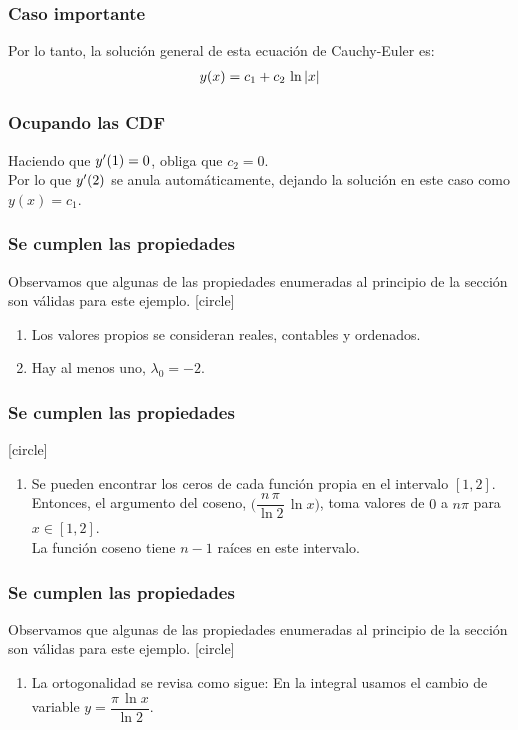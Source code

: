 \documentclass[12pt]{beamer}
\begin{document}
\begin{frame}
\frametitle{Caso importante}
Por lo tanto, la solución general de esta ecuación de Cauchy-Euler es:
\pause
\begin{align*}
y (x) = c_{1} + c_{2} \, \ln \abs{x}
\end{align*}
\end{frame}
\begin{frame}
\frametitle{Ocupando las CDF}
Haciendo que ${y}^{\prime} (1) = 0$, obliga que $c_{2} = 0$.
\\
\bigskip
\pause
Por lo que ${y}^{\prime} (2)$ se anula automáticamente, dejando la solución en este caso como $y(x) = c_{1}$.
\end{frame}
\begin{frame}
\frametitle{Se cumplen las propiedades}
Observamos que algunas de las propiedades enumeradas al principio de la sección son válidas para este ejemplo.
\pause
{}
[circle]
\begin{enumerate}[<+->]
\item Los valores propios se consideran reales, contables y ordenados.
\item Hay al menos uno, $\lambda_{0} = -2$.
\seti
\end{enumerate}
\end{frame}
\begin{frame}
\frametitle{Se cumplen las propiedades}
[circle]
\begin{enumerate}[<+->]
\conti
\item Se pueden encontrar los ceros de cada función propia en el intervalo $[1, 2]$. \pause Entonces, el argumento del coseno, $\bigg( \dfrac{n \, \pi}{\ln 2} \, \ln x \bigg)$, toma valores de $0$ a $n \pi$ para $x \in [1, 2]$. 
\\
\bigskip
\pause
La función coseno tiene $n - 1$ raíces en este intervalo.
\seti
\end{enumerate}
\end{frame}
\begin{frame}
\frametitle{Se cumplen las propiedades}
Observamos que algunas de las propiedades enumeradas al principio de la sección son válidas para este ejemplo.
\pause
{}
[circle]
\begin{enumerate}[<+->]
\conti
\item La ortogonalidad se revisa como sigue: En la integral usamos el cambio de variable $y = \dfrac{\pi \, \ln x}{\ln 2}$.
\end{enumerate}
\end{frame}
\end{document}
